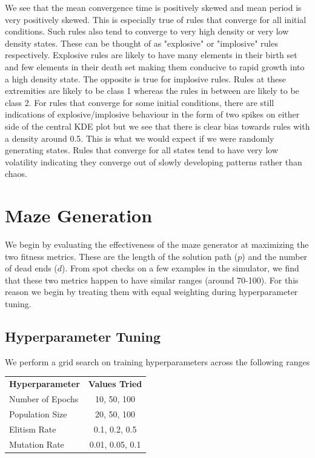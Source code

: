 We see that the mean convergence time is positively skewed and mean period is very positively skewed. This is especially true of rules that converge for all initial conditions. Such rules also tend to converge to very high density or very low density states. These can be thought of as "explosive" or "implosive" rules respectively. Explosive rules are likely to have many elements in their birth set and few elements in their death set making them conducive to rapid growth into a high density state. The opposite is true for implosive rules. Rules at these extremities are likely to be class 1 whereas the rules in between are likely to be class 2. For rules that converge for some initial conditions, there are still indications of explosive/implosive behaviour in the form of two spikes on either side of the central KDE plot but we see that there is clear bias towards rules with a density around 0.5. This is what we would expect if we were randomly generating states. Rules that converge for all states tend to have very low volatility indicating they converge out of slowly developing patterns rather than chaos.\\

\section{Maze Generation}

We begin by evaluating the effectiveness of the maze generator at maximizing the two fitness metrics. These are the length of the solution path ($p$) and the number of dead ends ($d$). From spot checks on a few examples in the simulator, we find that these two metrics happen to have similar ranges (around 70-100). For this reason we begin by treating them with equal weighting during hyperparameter tuning.\\

\subsection{Hyperparameter Tuning}

We perform a grid search on training hyperparameters across the following ranges
\begin{center}
    \begin{tabular}{ l c }
        \bf Hyperparameter & \bf Values Tried\\
        Number of Epochs & 10, 50, 100\\
        Population Size & 20, 50, 100\\
        Elitism Rate & 0.1, 0.2, 0.5\\
        Mutation Rate & 0.01, 0.05, 0.1
    \end{tabular}
\end{center}

